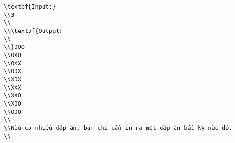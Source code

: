 \begin{verbatim}
\textbf{Input:}
\\3
\\
\\\textbf{Output:
\\
\\}OOO
\\OXO
\\OXX
\\OOX
\\XOX
\\XXX
\\XXO
\\XOO
\\OOO
\\
\\Nếu có nhiều đáp án, bạn chỉ cần in ra một đáp án bất kỳ nào đó.
\\\end{verbatim}